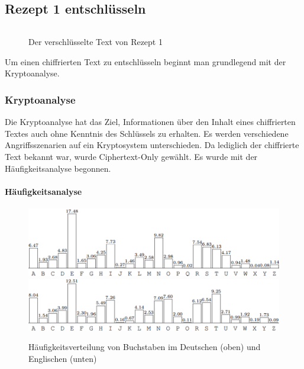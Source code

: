 \subsection{Rezept 1 entschlüsseln}
\label{RezeptEinsEntschluesseln}

\begin{figure}
\begin{lstlisting}

\end{lstlisting}
\caption{Der verschlüsselte Text von Rezept 1}
\end{figure}

Um einen chiffrierten Text zu entschlüsseln beginnt man grundlegend mit der Kryptoanalyse. 

\subsubsection{Kryptoanalyse}

Die Kryptoanalyse hat das Ziel, Informationen über den Inhalt eines chiffrierten
Textes auch ohne Kenntnis des Schlüssels zu erhalten. Es werden verschiedene
Angriffsszenarien auf ein Kryptosystem unterschieden. Da lediglich der
chiffrierte Text bekannt war, wurde Ciphertext-Only gewählt. Es wurde mit der
Häufigkeitsanalyse begonnen.

\paragraph{Häufigkeitsanalyse}

\begin{figure}
 \includegraphics[width=\textwidth,keepaspectratio=true]{Images/buchstabenhaeufigkeiten_de}
 \includegraphics[width=\textwidth,keepaspectratio=true]{Images/buchstabenhaeufigkeiten_en}
 \caption{Häufigkeitsverteilung von Buchstaben im Deutschen (oben) und Englischen (unten) \cite[kap2.pdf, s. 30]{Koebler}}
 \label{fig:buchstabenhaeufigkeiten}
\end{figure}


